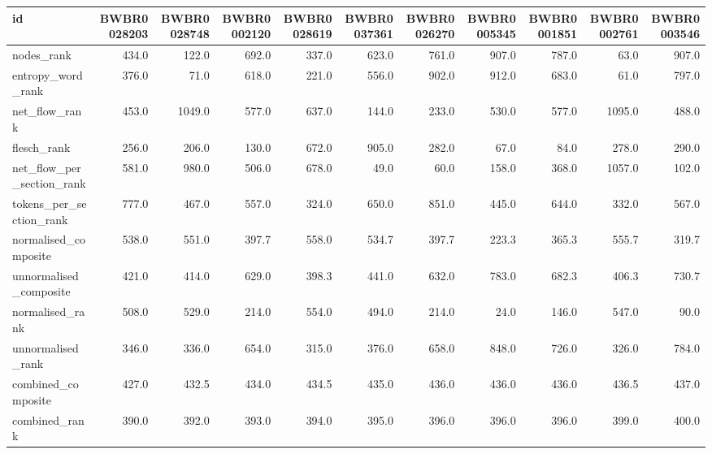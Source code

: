 \begin{tabular}{lrrrrrrrrrr}
\toprule
id & BWBR0028203 & BWBR0028748 & BWBR0002120 & BWBR0028619 & BWBR0037361 & BWBR0026270 & BWBR0005345 & BWBR0001851 & BWBR0002761 & BWBR0003546 \\
\midrule
nodes\_rank & 434.0 & 122.0 & 692.0 & 337.0 & 623.0 & 761.0 & 907.0 & 787.0 & 63.0 & 907.0 \\
\cline{1-11}
entropy\_word\_rank & 376.0 & 71.0 & 618.0 & 221.0 & 556.0 & 902.0 & 912.0 & 683.0 & 61.0 & 797.0 \\
\cline{1-11}
net\_flow\_rank & 453.0 & 1049.0 & 577.0 & 637.0 & 144.0 & 233.0 & 530.0 & 577.0 & 1095.0 & 488.0 \\
\cline{1-11}
flesch\_rank & 256.0 & 206.0 & 130.0 & 672.0 & 905.0 & 282.0 & 67.0 & 84.0 & 278.0 & 290.0 \\
\cline{1-11}
net\_flow\_per\_section\_rank & 581.0 & 980.0 & 506.0 & 678.0 & 49.0 & 60.0 & 158.0 & 368.0 & 1057.0 & 102.0 \\
\cline{1-11}
tokens\_per\_section\_rank & 777.0 & 467.0 & 557.0 & 324.0 & 650.0 & 851.0 & 445.0 & 644.0 & 332.0 & 567.0 \\
\cline{1-11}
normalised\_composite & 538.0 & 551.0 & 397.7 & 558.0 & 534.7 & 397.7 & 223.3 & 365.3 & 555.7 & 319.7 \\
\cline{1-11}
unnormalised\_composite & 421.0 & 414.0 & 629.0 & 398.3 & 441.0 & 632.0 & 783.0 & 682.3 & 406.3 & 730.7 \\
\cline{1-11}
normalised\_rank & 508.0 & 529.0 & 214.0 & 554.0 & 494.0 & 214.0 & 24.0 & 146.0 & 547.0 & 90.0 \\
\cline{1-11}
unnormalised\_rank & 346.0 & 336.0 & 654.0 & 315.0 & 376.0 & 658.0 & 848.0 & 726.0 & 326.0 & 784.0 \\
\cline{1-11}
combined\_composite & 427.0 & 432.5 & 434.0 & 434.5 & 435.0 & 436.0 & 436.0 & 436.0 & 436.5 & 437.0 \\
\cline{1-11}
combined\_rank & 390.0 & 392.0 & 393.0 & 394.0 & 395.0 & 396.0 & 396.0 & 396.0 & 399.0 & 400.0 \\
\cline{1-11}
\bottomrule
\end{tabular}
